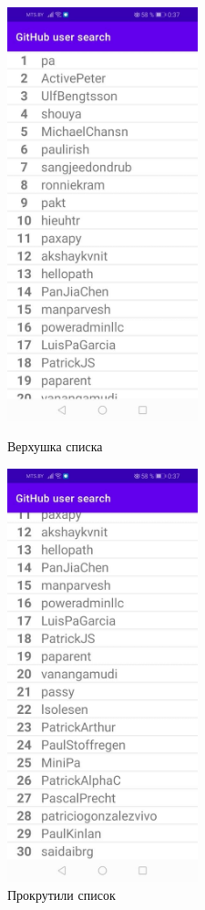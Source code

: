 \documentclass[12pt, a4paper, simple]{eskdtext}
\begin{document}
    \begin{figure}[!h]
        \centering
        \begin{minipage}{0.49\textwidth}
            \centering
            \includegraphics[height=12cm]
                {_assets/top.jpg}
            \caption{Верхушка списка}
            \label{fig:gpi_start}
        \end{minipage}
        \begin{minipage}{0.49\textwidth}
            \centering
            \includegraphics[height=12cm]
                {_assets/bottom.jpg}
            \caption{Прокрутили список}
            \label{fig:gpi_behind}
        \end{minipage}
    \end{figure}
\end{document}
